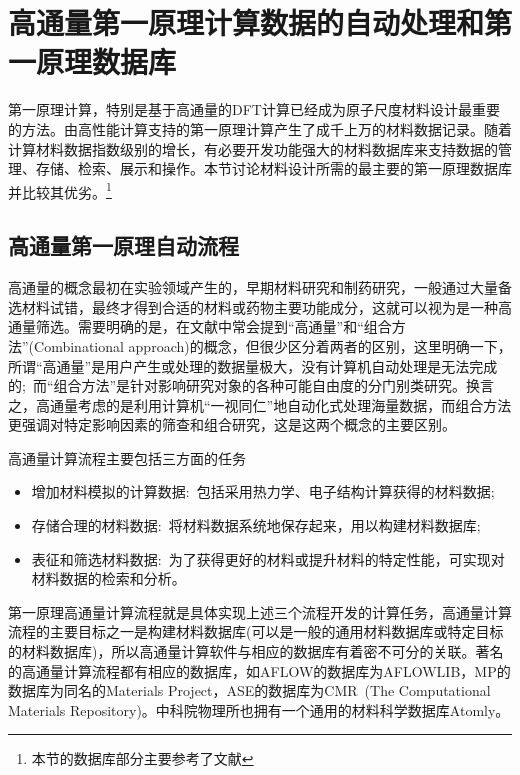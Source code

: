 \section{高通量第一原理计算数据的自动处理和第一原理数据库}\label{chap:database} 
第一原理计算，特别是基于高通量的\textrm{DFT}计算已经成为原子尺度材料设计最重要的方法。由高性能计算支持的第一原理计算产生了成千上万的材料数据记录。随着计算材料数据指数级别的增长，有必要开发功能强大的材料数据库来支持数据的管理、存储、检索、展示和操作。本节讨论材料设计所需的最主要的第一原理数据库并比较其优劣。\footnote{本节的数据库部分主要参考了文献}

\subsection{高通量第一原理自动流程}
高通量的概念最初在实验领域产生的，早期材料研究和制药研究，一般通过大量备选材料试错，最终才得到合适的材料或药物主要功能成分，这就可以视为是一种高通量筛选。需要明确的是，在文献中常会提到“高通量”和“组合方法”(\textrm{Combinational approach})的概念，但很少区分着两者的区别，这里明确一下，所谓“高通量”是用户产生或处理的数据量极大，没有计算机自动处理是无法完成的;~而“组合方法”是针对影响研究对象的各种可能自由度的分门别类研究。换言之，高通量考虑的是利用计算机“一视同仁”地自动化式处理海量数据，而组合方法更强调对特定影响因素的筛查和组合研究，这是这两个概念的主要区别。

高通量计算流程主要包括三方面的任务
\begin{itemize}
	\item 增加材料模拟的计算数据:~包括采用热力学、电子结构计算获得的材料数据;
	\item 存储合理的材料数据:~将材料数据系统地保存起来，用以构建材料数据库;
	\item 表征和筛选材料数据:~为了获得更好的材料或提升材料的特定性能，可实现对材料数据的检索和分析。
\end{itemize}
第一原理高通量计算流程就是具体实现上述三个流程开发的计算任务，高通量计算流程的主要目标之一是构建材料数据库(可以是一般的通用材料数据库或特定目标的材料数据库)，所以高通量计算软件与相应的数据库有着密不可分的关联。著名的高通量计算流程都有相应的数据库，如\textrm{AFLOW}的数据库为\textrm{AFLOWLIB}\cite{CMS58-227_2012,AFLOWORG_URL}，\textrm{MP}的数据库为同名的\textrm{Materials Project}\cite{CMS50-2295_2011,MP_URL}，\textrm{ASE}的数据库为\textrm{CMR~(The Computational Materials Repository)}\cite{CSE14-51_2012,CMR_URL}。中科院物理所也拥有一个通用的材料科学数据库\textrm{Atomly}\cite{ATOMLY_URL}。

